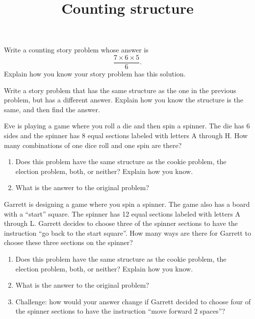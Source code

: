 \documentclass[nooutcomes,noauthor]{ximera}
\title{Counting structure}
\begin{document}
\begin{abstract}
\end{abstract}
\maketitle



\begin{problem}

Write a counting story problem whose answer is
\[
\frac{7 \times 6 \times 5}{6}.
\]
Explain how you know your story problem has this solution.


\end{problem}


\begin{problem}

Write a story problem that has the same structure as the one in the previous problem, but has a different answer. Explain how you know the structure is the same, and then find the answer.

\end{problem}



\begin{problem}

Eve is playing a game where you roll a die and then spin a spinner. The die has 6 sides and the spinner has 8 equal sections labeled with letters A through H. How many combinations of one dice roll and one spin are there?

\begin{enumerate}
	\item Does this problem have the same structure as the cookie problem, the election problem, both, or neither? Explain how you know.
	\item What is the answer to the original problem?
\end{enumerate}

\end{problem}

\begin{problem}

Garrett is designing a game where you spin a spinner. The game also has a board with a ``start'' square. The spinner has 12 equal sections labeled with letters A through L. Garrett decides to choose three of the spinner sections to have the instruction ``go back to the start square''. How many ways are there for Garrett to choose these three sections on the spinner?

\begin{enumerate}
	\item Does this problem have the same structure as the cookie problem, the election problem, both, or neither? Explain how you know.
	\item What is the answer to the original problem?
	\item Challenge: how would your answer change if Garrett decided to choose four of the spinner sections to have the instruction ``move forward 2 spaces''?
\end{enumerate}

\end{problem}
\end{document}
